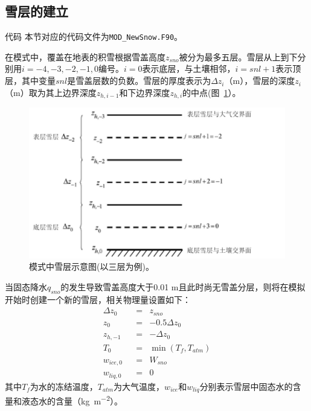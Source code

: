 \subsection{雪层的建立}
\begin{mymdframed}{代码}
本节对应的代码文件为\texttt{MOD\_NewSnow.F90}。
\end{mymdframed}

在模式中，覆盖在地表的积雪根据雪盖高度$z_{sno}$被分为最多五层。雪层从上到下分别用$i = −4, −3, −2, −1, 0$编号。$i = 0$表示底层，与土壤相邻，$i = snl + 1$表示顶层，其中变量$snl$是雪盖层数的负数。雪层的厚度表示为$\Delta z_i$（m），雪层的深度$z_i$（m）取为其上边界深度$z_{h,i-1}$和下边界深度$z_{h,i}$的中点(图~\ref{fig:模式中积雪雪层示意图}）。
{
\begin{figure}[h]
\centering
\includegraphics{Figures/雪盖土壤热力过程/模式中积雪雪层示意图.png}
\caption{模式中雪层示意图(以三层为例)。}
\label{fig:模式中积雪雪层示意图}
\end{figure}
}

当固态降水$q_{sno}$的发生导致雪盖高度大于0.01 m且此时尚无雪盖分层，则将在模拟开始时创建一个新的雪层，相关物理量设置如下：
\begin{equation}
\begin{aligned}
& \Delta z_{0} &&= &{z}_{sno}& \\
& z_0 &&= &-0.5\Delta z_0& \\
& z_{h,-1} &&= &-\Delta z_0& \\
& T_0 &&= &\min \left(T_f,T_{atm}\right)& \\
& w_{ice,0} &&= &W_{sno}& \\
& w_{liq,0} &&= &0&
\end{aligned}
\end{equation}
其中$T_f$为水的冻结温度，$T_{atm}$为大气温度，$w_{ice}$和$w_{liq}$分别表示雪层中固态水的含量和液态水的含量（\unit{kg.m^{-2}}）。




